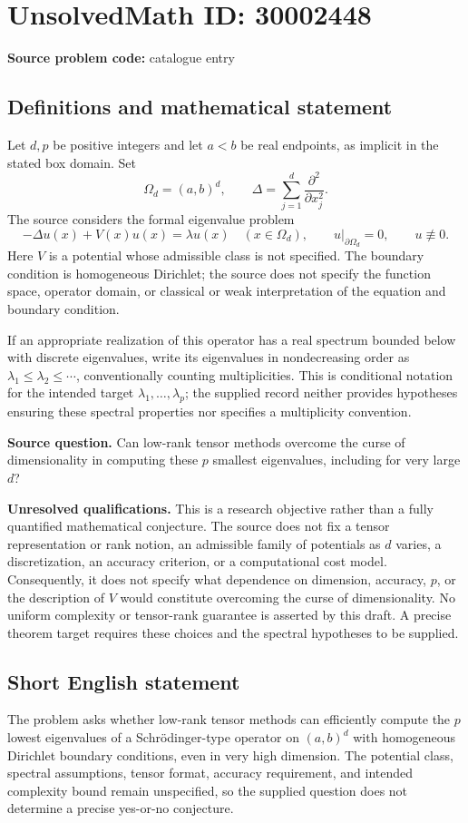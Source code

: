 \documentclass[11pt]{article}
\begin{document}
\section*{UnsolvedMath ID: 30002448}
\textbf{Source problem code:} catalogue entry
\subsection{Definitions and mathematical statement}
Let \(d,p\) be positive integers and let \(a<b\) be real endpoints, as implicit in the stated box domain. Set
\[
\Omega_d=(a,b)^d,\qquad \Delta=\sum_{j=1}^{d}\frac{\partial^2}{\partial x_j^2}.
\]
The source considers the formal eigenvalue problem
\[
-\Delta u(x)+V(x)u(x)=\lambda u(x)\quad (x\in\Omega_d),\qquad u|_{\partial\Omega_d}=0,\qquad u\not\equiv0.
\]
Here \(V\) is a potential whose admissible class is not specified. The boundary condition is homogeneous Dirichlet; the source does not specify the function space, operator domain, or classical or weak interpretation of the equation and boundary condition.

If an appropriate realization of this operator has a real spectrum bounded below with discrete eigenvalues, write its eigenvalues in nondecreasing order as \(\lambda_1\leq\lambda_2\leq\cdots\), conventionally counting multiplicities. This is conditional notation for the intended target \(\lambda_1,\ldots,\lambda_p\); the supplied record neither provides hypotheses ensuring these spectral properties nor specifies a multiplicity convention.

\textbf{Source question.} Can low-rank tensor methods overcome the curse of dimensionality in computing these \(p\) smallest eigenvalues, including for very large \(d\)?

\textbf{Unresolved qualifications.} This is a research objective rather than a fully quantified mathematical conjecture. The source does not fix a tensor representation or rank notion, an admissible family of potentials as \(d\) varies, a discretization, an accuracy criterion, or a computational cost model. Consequently, it does not specify what dependence on dimension, accuracy, \(p\), or the description of \(V\) would constitute overcoming the curse of dimensionality. No uniform complexity or tensor-rank guarantee is asserted by this draft. A precise theorem target requires these choices and the spectral hypotheses to be supplied.
\subsection{Short English statement}
The problem asks whether low-rank tensor methods can efficiently compute the \(p\) lowest eigenvalues of a Schr\"odinger-type operator on \((a,b)^d\) with homogeneous Dirichlet boundary conditions, even in very high dimension. The potential class, spectral assumptions, tensor format, accuracy requirement, and intended complexity bound remain unspecified, so the supplied question does not determine a precise yes-or-no conjecture.
\end{document}
